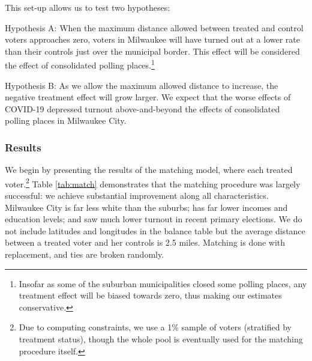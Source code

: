 \documentclass[
  12pt,
]{article}
\begin{document}
This set-up allows us to test two hypotheses:

Hypothesis A: When the maximum distance allowed between treated and control voters approaches zero, voters in Milwaukee will have turned out at a lower rate than their controls just over the municipal border. This effect will be considered the effect of consolidated polling places.\footnote{Insofar as some of the suburban municipalities closed some polling places, any treatment effect will be biased towards zero, thus making our estimates conservative.}

Hypothesis B: As we allow the maximum allowed distance to increase, the negative treatment effect will grow larger. We expect that the worse effects of COVID-19 depressed turnout above-and-beyond the effects of consolidated polling places in Milwaukee City.

\hypertarget{results}{%
\subsubsection*{Results}\label{results}}

We begin by presenting the results of the matching model, where each treated voter.\footnote{Due to computing constraints, we use a 1\% sample of voters (stratified by treatment status), though the whole pool is eventually used for the matching procedure itself.} Table \ref{tab:match} demonstrates that the matching procedure was largely successful: we achieve substantial improvement along all characteristics. Milwaukee City is far less white than the suburbs; has far lower incomes and education levels; and saw much lower turnout in recent primary elections. We do not include latitudes and longitudes in the balance table but the average distance between a treated voter and her controls is 2.5 miles. Matching is done with replacement, and ties are broken randomly.
\end{document}
